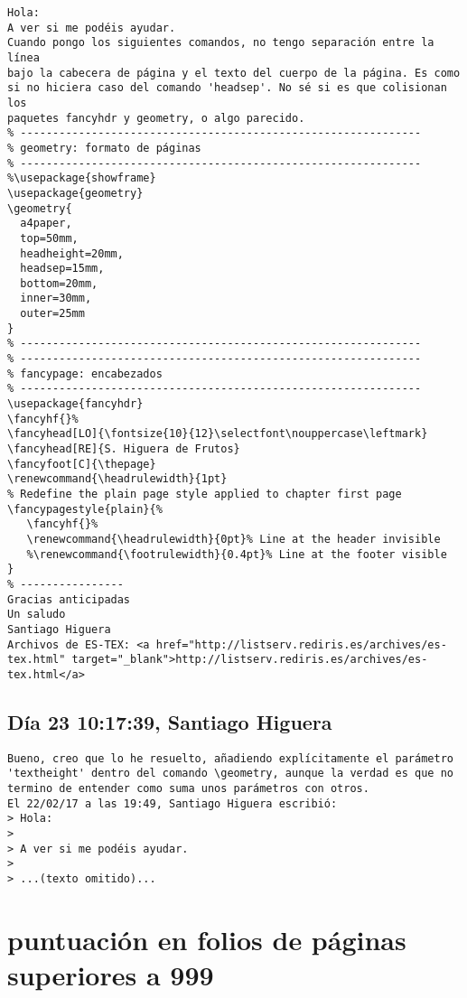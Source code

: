 \documentclass[a4paper,10pt]{article}
\begin{document}
\begin{lstlisting}
Hola:
A ver si me podéis ayudar.
Cuando pongo los siguientes comandos, no tengo separación entre la línea 
bajo la cabecera de página y el texto del cuerpo de la página. Es como 
si no hiciera caso del comando 'headsep'. No sé si es que colisionan los 
paquetes fancyhdr y geometry, o algo parecido.
% --------------------------------------------------------------
% geometry: formato de páginas
% --------------------------------------------------------------
%\usepackage{showframe}
\usepackage{geometry}
\geometry{
  a4paper,
  top=50mm,
  headheight=20mm,
  headsep=15mm,
  bottom=20mm,
  inner=30mm,
  outer=25mm
}
% --------------------------------------------------------------
% --------------------------------------------------------------
% fancypage: encabezados
% --------------------------------------------------------------
\usepackage{fancyhdr}
\fancyhf{}%
\fancyhead[LO]{\fontsize{10}{12}\selectfont\nouppercase\leftmark}
\fancyhead[RE]{S. Higuera de Frutos}
\fancyfoot[C]{\thepage}
\renewcommand{\headrulewidth}{1pt}
% Redefine the plain page style applied to chapter first page
\fancypagestyle{plain}{%
   \fancyhf{}%
   \renewcommand{\headrulewidth}{0pt}% Line at the header invisible
   %\renewcommand{\footrulewidth}{0.4pt}% Line at the footer visible
}
% ----------------
Gracias anticipadas
Un saludo
Santiago Higuera
Archivos de ES-TEX: <a href="http://listserv.rediris.es/archives/es-tex.html" target="_blank">http://listserv.rediris.es/archives/es-tex.html</a>

\end{lstlisting}

\subsection{Día 23 10:17:39, Santiago Higuera}

\begin{lstlisting}
Bueno, creo que lo he resuelto, añadiendo explícitamente el parámetro 
'textheight' dentro del comando \geometry, aunque la verdad es que no 
termino de entender como suma unos parámetros con otros.
El 22/02/17 a las 19:49, Santiago Higuera escribió:
> Hola:
>
> A ver si me podéis ayudar.
>
> ...(texto omitido)...

\end{lstlisting}
\section{puntuación en folios de páginas superiores a 999}
\end{document}
